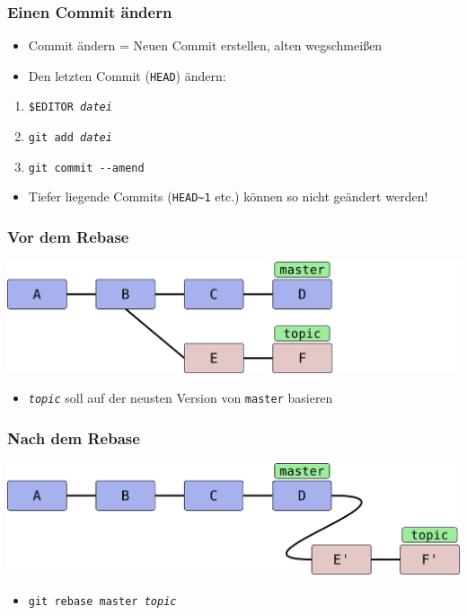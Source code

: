 \documentclass{beamer}
\begin{document}
\begin{frame}
 \frametitle{Einen Commit ändern}
  


\begin{itemize}
  \item Commit ändern = Neuen Commit erstellen, alten wegschmeißen
  \item Den letzten Commit (\texttt{HEAD}) ändern:
\end{itemize}

\begin{enumerate}
  \item \texttt{\$EDITOR \emph{datei}}
  \item \texttt{git add \emph{datei}}
  \item \texttt{git commit -{}-amend}
\end{enumerate}

\begin{itemize}
  \item Tiefer liegende Commits (\texttt{HEAD\textasciitilde{}1} etc.) können so nicht geändert werden!
\end{itemize}

  
 \end{frame}
\begin{frame}
 \frametitle{Vor dem Rebase}
  


\begin{center}
\includegraphics[scale=0.12]{bilder/rebase-vorher.pdf}
\end{center}

\begin{itemize}
  \item \texttt{\emph{topic}} soll auf der neusten Version von \texttt{master} basieren
\end{itemize}

  
 \end{frame}
\begin{frame}
 \frametitle{Nach dem Rebase}
  


\begin{center}
\includegraphics[scale=0.12]{bilder/rebase-nachher.pdf}
\end{center}

\begin{itemize}
  \item \texttt{git rebase master \emph{topic}}
\end{itemize}

  
 \end{frame}
\end{document}
